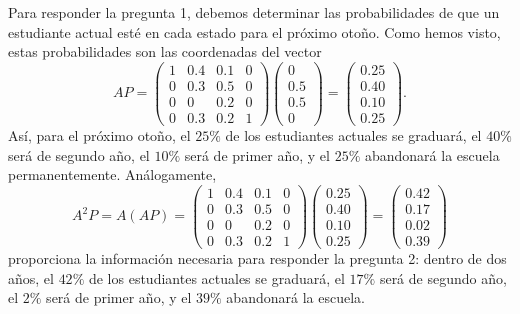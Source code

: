 \documentclass[12pt,a4paper]{book}
\begin{document}
    Para responder la pregunta 1, debemos determinar las probabilidades de que un estudiante actual esté en cada estado para el próximo otoño. Como hemos visto, estas probabilidades son las coordenadas del vector
    \begin{equation*}
        AP=\begin{pmatrix}1&0.4&0.1&0\\0&0.3&0.5&0\\0&0&0.2&0\\0&0.3&0.2&1\end{pmatrix}\begin{pmatrix}0\\0.5\\0.5\\0\end{pmatrix}=\begin{pmatrix}0.25\\0.40\\0.10\\0.25\end{pmatrix}.
    \end{equation*}
    Así, para el próximo otoño, el $25\%$ de los estudiantes actuales se graduará, el $40\%$ será de segundo año, el $10\%$ será de primer año, y el $25\%$ abandonará la escuela permanentemente. Análogamente,
    \begin{equation*}
        A^2P=A(AP)=\begin{pmatrix}1&0.4&0.1&0\\0&0.3&0.5&0\\0&0&0.2&0\\0&0.3&0.2&1\end{pmatrix}\begin{pmatrix}0.25\\0.40\\0.10\\0.25\end{pmatrix}=\begin{pmatrix}0.42\\0.17\\0.02\\0.39\end{pmatrix}
    \end{equation*}
    proporciona la información necesaria para responder la pregunta 2: dentro de dos años, el $42\%$ de los estudiantes actuales se graduará, el $17\%$ será de segundo año, el $2\%$ será de primer año, y el $39\%$ abandonará la escuela.
\end{document}
